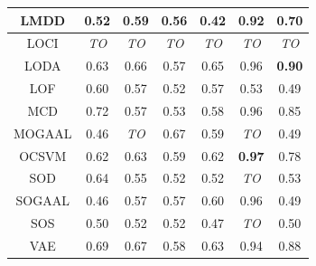 \begin{table}[!t]
\begin{center}
\begin{small}
\begin{tabular}{|c|c|c|c|c|c|c|}
\hline
LMDD &                0.52 &           0.59 &               0.56 &               0.42 &             0.92 &             0.70 \\
\hline
LOCI &         \textit{TO} &    \textit{TO} &        \textit{TO} &        \textit{TO} &      \textit{TO} &      \textit{TO} \\
\hline
LODA &                0.63 &           0.66 &               0.57 &               0.65 &             0.96 &    \textbf{0.90} \\
\hline
LOF &                0.60 &           0.57 &               0.52 &               0.57 &             0.53 &             0.49 \\
\hline
MCD &                0.72 &           0.57 &               0.53 &               0.58 &             0.96 &             0.85 \\
\hline
MOGAAL &                0.46 &    \textit{TO} &               0.67 &               0.59 &      \textit{TO} &             0.49 \\
\hline
OCSVM &                0.62 &           0.63 &               0.59 &               0.62 &    \textbf{0.97} &             0.78 \\
\hline
SOD &                0.64 &           0.55 &               0.52 &               0.52 &      \textit{TO} &             0.53 \\
\hline
SOGAAL &                0.46 &           0.57 &               0.57 &               0.60 &             0.96 &             0.49 \\
\hline
SOS &                0.50 &           0.52 &               0.52 &               0.47 &      \textit{TO} &             0.50 \\
\hline
VAE &                0.69 &           0.67 &               0.58 &               0.63 &             0.94 &             0.88 \\
\hline
\end{tabular}
\end{small}
\end{center}
\vskip -0.1in
\end{table}

